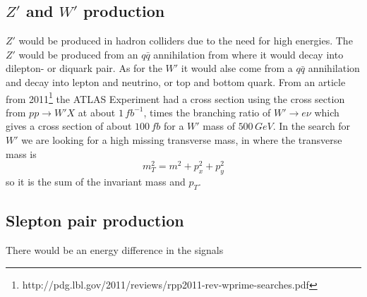 \documentclass{article}
\begin{document}
\subsection{$Z'$ and $W'$ production}
$Z'$ would be produced in hadron colliders due to the need for high energies.
The $Z'$ would be produced from an $q\bar{q}$ annihilation from where it would
decay into dilepton- or diquark pair. As for the $W'$ it would alse come from a $q\bar{q}$
annihilation and decay into lepton and neutrino, or top and bottom quark.
From an article from 2011\footnote{http://pdg.lbl.gov/2011/reviews/rpp2011-rev-wprime-searches.pdf}
the ATLAS Experiment had a cross section using the cross section from 
$pp \rightarrow W'X$ at about $1\,fb^{-1}$, times the branching ratio of 
$W'\rightarrow e\nu$ which gives a cross section of about $100\,fb$ for a $W'$ mass of $500\,GeV$. 
In the search for $W'$ we are looking for a high missing transverse mass, in where the transverse
mass is 
\[ m_T^2 = m^2 + p_x^2 + p_y^2\]
so it is the sum of the invariant mass and $p_T$.

\subsection{Slepton pair production}
There would be an energy difference in the signals
\end{document}
